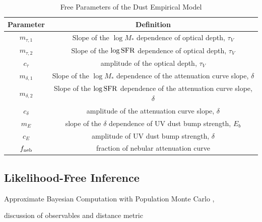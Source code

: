 \begin{table}
    \caption{Free Parameters of the Dust Empirical Model} 
    \begin{center}
        \begin{tabular}{cc} \toprule
            Parameter & Definition \\[3pt] \hline\hline
            $m_{\tau,1}$ & Slope of the $\log M_*$ dependence of optical depth, $\tau_V$\\
            $m_{\tau,2}$ & Slope of the $\log {\rm SFR}$ dependence of optical depth, $\tau_V$\\
            $c_{\tau}$ & amplitude of the optical depth, $\tau_V$\\
            $m_{\delta,1}$ & Slope of the $\log M_*$ dependence of the attenuation curve slope, $\delta$\\
            $m_{\delta,2}$ & Slope of the $\log {\rm SFR}$ dependence of the attenuation curve slope, $\delta$\\
            $c_{\delta}$ & amplitude of the attenuation curve slope, $\delta$\\
            $m_{E}$ & slope of the $\delta$ dependence of UV dust bump strength, $E_b$\\
            $c_{E}$ & amplitude of UV dust bump strength, $\delta$\\
            $f_{\rm neb}$ & fraction of nebular attenuation curve\\
            \hline
        \end{tabular} \label{tab:free_param}
    \end{center}
\end{table}

\subsection{Likelihood-Free Inference} 
Approximate Bayesian Computation with Population Monte Carlo \cite{hahn2017a},

discussion of observables and distance metric 
\cite{ishida2015} 

